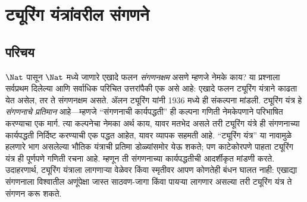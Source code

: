 \chapter{ट्यूरिंग यंत्रांवरील संगणने}\label{tur:mac::chap}








\section{परिचय}\label{tur:mac:int:sec}

$\Nat$ पासून $\Nat$ मध्ये जाणारे एखादे फलन \emph{संगणनक्षम} असणे म्हणजे
नेमके काय? या प्रश्नाला सर्वप्रथम दिलेल्या आणि सर्वाधिक परिचित
उत्तरांपैकी एक असे आहे: एखादे फलन ट्यूरिंग यंत्राने काढता येत असेल, तर ते
संगणनक्षम असते. ॲलन ट्यूरिंग यांनी 1936 मध्ये ही संकल्पना मांडली.
ट्यूरिंग यंत्र हे \emph{संगणनाचे प्रतिमान} आहे---म्हणजे ``संगणनाची
कार्यपद्धती'' ही कल्पना गणिती नेमकेपणाने परिभाषित करण्याचा एक मार्ग.
त्या कल्पनेचा नेमका अर्थ काय, यावर मतभेद असले तरी ट्यूरिंग यंत्रे ही
संगणनाच्या कार्यपद्धती निर्दिष्ट करण्याची एक पद्धत आहेत, यावर व्यापक
सहमती आहे. ``ट्यूरिंग यंत्र'' या नावामुळे हलणारे भाग असलेल्या भौतिक
यंत्राची प्रतिमा डोळ्यांसमोर येऊ शकते; पण काटेकोरपणे पाहता ट्यूरिंग
यंत्र ही पूर्णपणे गणिती रचना आहे. म्हणून ती संगणनाच्या कार्यपद्धतीची
आदर्शीकृत मांडणी करते. उदाहरणार्थ, ट्यूरिंग यंत्राला लागणाऱ्या वेळेवर
किंवा स्मृतीवर आपण कोणतेही बंधन घालत नाही: एखाद्या संगणनाला विश्वातील
अणूंपेक्षा जास्त साठवण-जागा किंवा पायऱ्या लागणार असल्या तरी ट्यूरिंग
यंत्र ते संगणन करू शकते.

